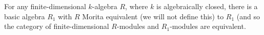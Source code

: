 For any finite-dimensional $k$-algebra $R$, where $k$ is algebraically closed,
there is a basic algebra $R_1$ with $R$ Morita equivalent (we will not define
this) to $R_1$ (and so the category of finite-dimensional $R$-modules and
$R_1$-modules are equivalent.
